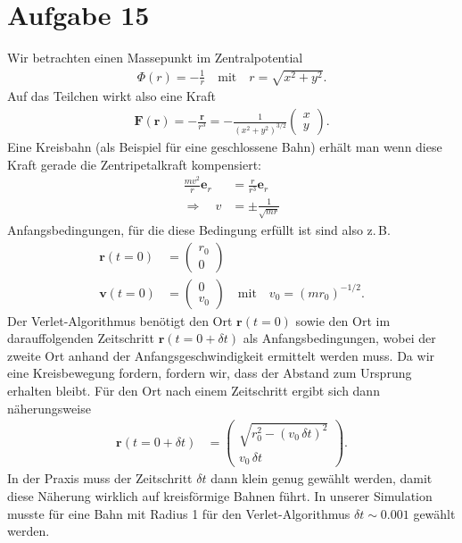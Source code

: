\documentclass[a4paper,11pt]{scrartcl}
\renewcommand{\vec}[1]{\mathbf{#1}}
\newcommand*{\zB}{z.\,B.\xspace }
\begin{document}
\section*{Aufgabe 15} %
\label{sec:aufgabe_15}
Wir betrachten einen Massepunkt im Zentralpotential \begin{align}
	\Phi(r) = - \frac{1}{r} \quad\text{mit}\quad r = \sqrt{x^2+y^2} .
\end{align}
Auf das Teilchen wirkt also eine Kraft \begin{align}
	\vec{F}(\vec{r}) = - \frac{\vec{r}}{r^3} = - \frac{1}{(x^2+y^2)^{3/2}} \left(
	\begin{array}{c}
	x
	\\ y\end{array} \right) .
\end{align}
Eine Kreisbahn (als Beispiel für eine geschlossene Bahn) erhält man wenn diese Kraft gerade die Zentripetalkraft kompensiert: \begin{align}
	\frac{m v^2}{r} \vec{e}_r &= \frac{r}{r^3} \vec{e}_r\\
	\Rightarrow\quad v &= \pm \frac{1}{\sqrt{m r}} 
\end{align}
Anfangsbedingungen, für die diese Bedingung erfüllt ist sind also \zB \begin{align}
	\vec{r}(t=0) &= \left(
	\begin{array}{c}
	r_0\\ 
	0\end{array} \right)\\
	\vec{v}(t=0) &= \left(
	\begin{array}{c}
	0\\ 
	v_0 \end{array} \right) \quad\text{mit}\quad v_0 = (m r_0)^{-1/2}.
\end{align}
Der Verlet-Algorithmus benötigt den Ort $\vec{r}(t=0)$ sowie den Ort im darauffolgenden Zeitschritt $\vec{r}(t=0+\delta t)$ als Anfangsbedingungen, wobei der zweite Ort anhand der Anfangsgeschwindigkeit ermittelt werden muss. Da wir eine Kreisbewegung fordern, fordern wir, dass der Abstand zum Ursprung erhalten bleibt. Für den Ort nach einem Zeitschritt ergibt sich dann näherungsweise \begin{align}
	\vec{r}(t=0+\delta t) &= \left(
	\begin{array}{c}
	\sqrt{r_0^2 - (v_0\,\delta t)^2 } \\ 
	v_0\,\delta t \end{array} \right).
\end{align}
In der Praxis muss der Zeitschritt $\delta t$ dann klein genug gewählt werden, damit diese Näherung wirklich auf kreisförmige Bahnen führt. In unserer Simulation musste für eine Bahn mit Radius 1 für den Verlet-Algorithmus $\delta t \sim 0.001$ gewählt werden.
\end{document}
